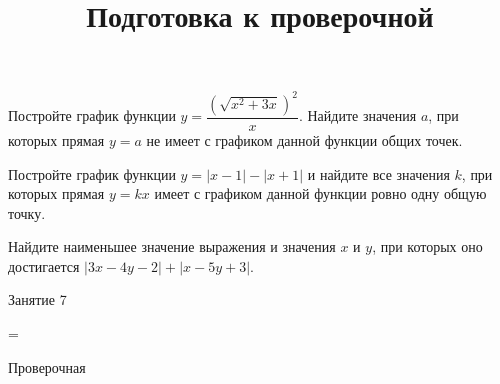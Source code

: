 \begin{homework}[number=3]
	\begin{listofex}
		\item Постройте график функции \( y=\dfrac{(\sqrt{x^2+3x})^2}{x} \).  Найдите значения \( a \), при которых прямая \( y=a \) не имеет с графиком данной функции общих точек.
		\item Постройте график функции \( y=|x-1|-|x+1| \) и найдите все значения \( k \), при которых прямая \( y=kx \) имеет с графиком данной функции ровно одну общую точку.
		\item Найдите наименьшее значение выражения и значения \( x \) и \( y \), при которых оно достигается \( |3x-4y-2|+|x-5y+3| \).
	\end{listofex}
\end{homework}

\begin{class}[number=7]
	\title{Подготовка к проверочной}
	\begin{listofex}
		\item Занятие 7
	\end{listofex}
\end{class}

=%
\begin{exam}
	\begin{listofex}
		\item Проверочная
	\end{listofex}
\end{exam}
